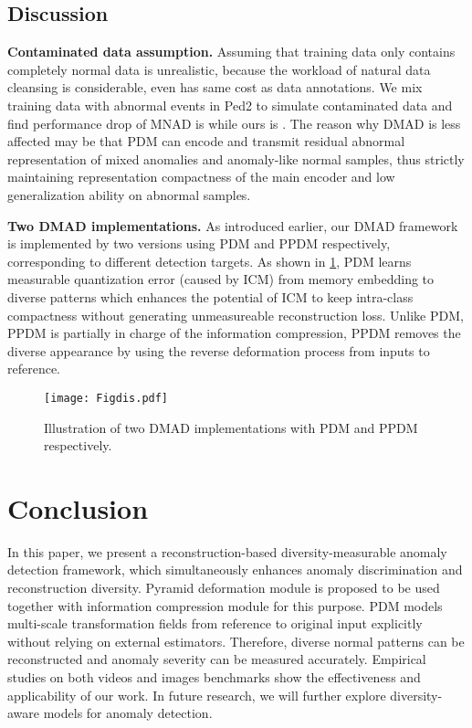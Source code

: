 \documentclass[10pt,twocolumn,letterpaper]{article}
\begin{document}
    \subsection{Discussion}
        \textbf{Contaminated data assumption.}
        Assuming that training data only contains completely normal data is unrealistic, because the workload of natural data cleansing is considerable, even has same cost as data annotations. We mix training data with abnormal events in Ped2 to simulate contaminated data and find performance drop of MNAD\cite{mnad} is  while ours is . The reason why DMAD is less affected may be that PDM can encode and transmit residual abnormal representation of mixed anomalies and anomaly-like normal samples, thus strictly maintaining representation compactness of the main encoder and low generalization ability on abnormal samples.
        
        \textbf{Two DMAD implementations.}
        As introduced earlier, our DMAD framework is implemented by two versions using PDM and PPDM respectively, corresponding to different detection targets.
        As shown in \cref{fig:dis}, PDM learns measurable quantization error (caused by ICM) from memory embedding to diverse patterns which enhances the potential of ICM to keep intra-class compactness without generating unmeasureable reconstruction loss. Unlike PDM, PPDM is partially in charge of the information compression, \ie PPDM removes the diverse appearance by using the reverse deformation process from inputs to reference.
        
        \begin{figure}[t]
          \centering
          \texttt{[image: Figdis.pdf]}
          \caption{Illustration of two DMAD implementations with PDM and PPDM respectively.
          }
          \label{fig:dis}
          \vspace{-0.1em}
        \end{figure}

\section{Conclusion}
    In this paper, we present a reconstruction-based diversity-measurable anomaly detection framework, which simultaneously enhances anomaly discrimination and reconstruction diversity. Pyramid deformation module is proposed to be used together with information compression module for this purpose. PDM models multi-scale transformation fields from reference to original input explicitly without relying on external estimators. Therefore, diverse normal patterns can be reconstructed and anomaly severity can be measured accurately. Empirical studies on both videos and images benchmarks show the effectiveness and applicability of our work. In future research, we will further explore diversity-aware models for anomaly detection.
    
\end{document}
